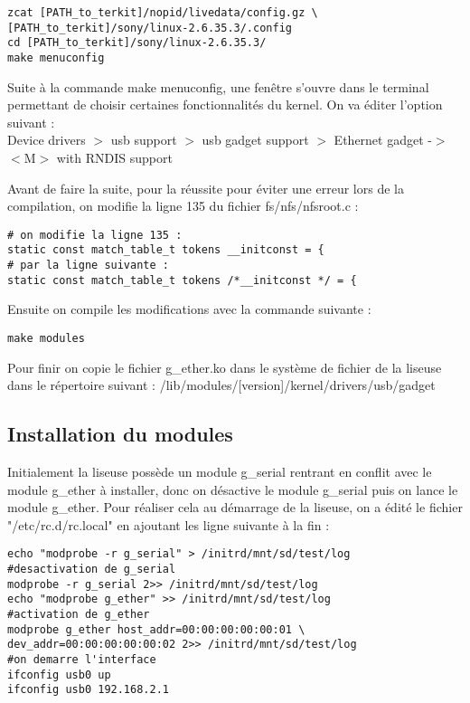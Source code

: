 \begin{lstlisting}
zcat [PATH_to_terkit]/nopid/livedata/config.gz \
[PATH_to_terkit]/sony/linux-2.6.35.3/.config
cd [PATH_to_terkit]/sony/linux-2.6.35.3/
make menuconfig
\end{lstlisting}

Suite à la commande make menuconfig, une fenêtre s'ouvre dans le terminal permettant de choisir certaines fonctionnalités du kernel. On va éditer l'option suivant : \\
Device drivers $>$ usb support $>$ usb gadget support $>$ Ethernet gadget -$>$ $<$M$>$ with RNDIS support

Avant de faire la suite, pour la réussite pour éviter une erreur lors de la compilation, on modifie la ligne 135 du fichier fs/nfs/nfsroot.c :

\begin{lstlisting}
# on modifie la ligne 135 :
static const match_table_t tokens __initconst = {
# par la ligne suivante :
static const match_table_t tokens /*__initconst */ = { 
\end{lstlisting} 

Ensuite on compile les modifications avec la commande suivante :

\begin{lstlisting}
make modules
\end{lstlisting}

Pour finir on copie le fichier g_ether.ko dans le système de fichier de la liseuse dans le répertoire suivant : /lib/modules/[version]/kernel/drivers/usb/gadget
 
\subsection{Installation du modules}

Initialement la liseuse possède un module g_serial rentrant en conflit avec le module g_ether à installer, donc on désactive le module g_serial puis on lance le module g_ether. Pour réaliser cela au démarrage de la liseuse, on a édité le fichier "/etc/rc.d/rc.local" en ajoutant les ligne suivante à la fin : 

\begin{lstlisting}
echo "modprobe -r g_serial" > /initrd/mnt/sd/test/log
#desactivation de g_serial
modprobe -r g_serial 2>> /initrd/mnt/sd/test/log
echo "modprobe g_ether" >> /initrd/mnt/sd/test/log
#activation de g_ether
modprobe g_ether host_addr=00:00:00:00:00:01 \
dev_addr=00:00:00:00:00:02 2>> /initrd/mnt/sd/test/log
#on demarre l'interface
ifconfig usb0 up
ifconfig usb0 192.168.2.1
\end{lstlisting}		

